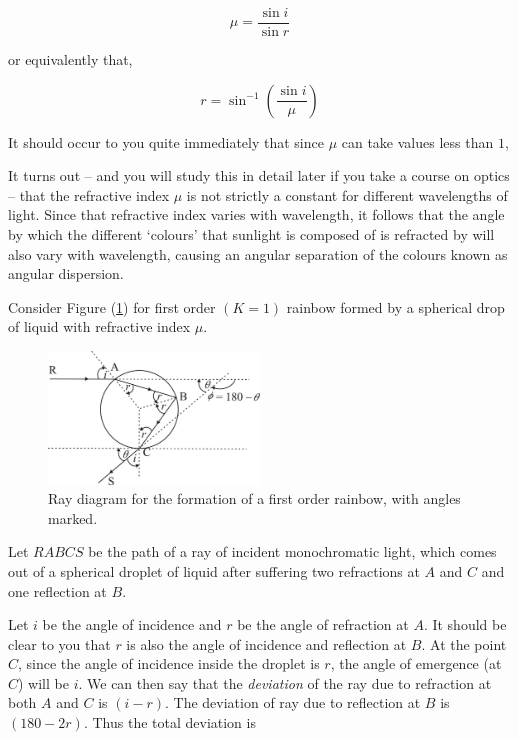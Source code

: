  \begin{equation}
    \mu=\frac{\sin i}{\sin r}
    \label{snell}
 \end{equation}

 or equivalently that,
 
 \begin{equation}
     r = \sin^{-1}\left(\frac{\sin i}{\mu}\right)
     \label{rasfnofu}
 \end{equation}

It should occur to you quite immediately that since $\mu$ can take values less than $1$, 


It turns out -- and you will study this in detail later if you take a course on optics -- that the refractive index $\mu$ is not strictly a constant for different wavelengths of light. Since that refractive index varies with wavelength, it follows that the angle by which the different `colours' that sunlight is composed of is refracted by will also vary with wavelength, causing an angular separation of the colours known as angular dispersion.



Consider Figure (\ref{fig:firstorder1}) for first order $(K = 1)$ rainbow formed by a spherical drop of liquid with refractive index $\mu$.

\begin{figure}[!htb]
    \centering
    \includegraphics[width=0.5\textwidth]{figs/img3.jpg}
    \caption{Ray diagram for the formation of a first order rainbow, with angles marked.}
    \label{fig:firstorder1}
\end{figure}


Let $RABCS$ be the path of a ray of incident monochromatic light, which comes out of a spherical droplet of liquid after suffering two refractions at $A$ and $C$ and one reflection at $B$.

Let $i$ be the angle of incidence and $r$ be the angle of refraction at $A$. It should be clear to you that $r$ is also the angle of incidence and reflection at $B$. At the point $C$, since the angle of incidence inside the droplet is $r$, the angle of emergence (at $C$) will be $i$. We can then say that the \textit{deviation} of the ray due to refraction at both $A$ and $C$ is $(i-r)$. The deviation of ray due to reflection at $B$ is $(180 - 2r)$. Thus the total deviation is

